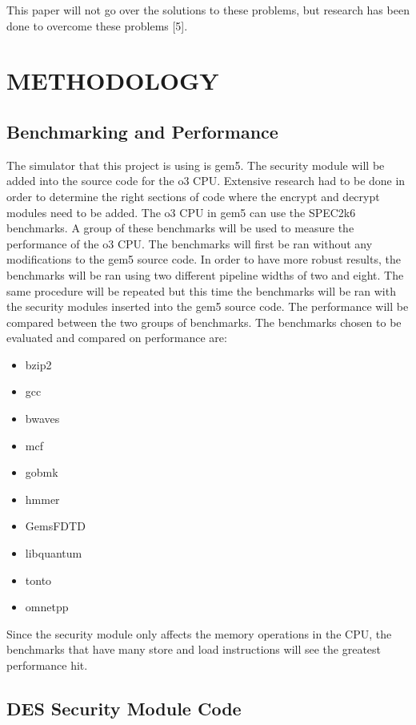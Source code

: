 \documentclass[letterpaper, 10 pt, conference]{ieeeconf}  %
\begin{document}
This paper will not go over the solutions to these problems, but research has been done to overcome these problems [5].  

\section{METHODOLOGY}

\subsection{Benchmarking and Performance}

The simulator that this project is using is gem5. The security module will be added into the source code for the o3 CPU. Extensive research had to be done in order to determine the right sections of code where the encrypt and decrypt modules need to be added.  The o3 CPU in gem5 can use the SPEC2k6 benchmarks.  A group of these benchmarks will be used to measure the performance of the o3 CPU.  The benchmarks will first be ran without any modifications to the gem5 source code.  In order to have more robust results, the benchmarks will be ran using two different pipeline widths of two and eight.  The same procedure will be repeated but this time the benchmarks will be ran with the security modules inserted into the gem5 source code. The performance will be compared between the two groups of benchmarks.  The benchmarks chosen to be evaluated and compared on performance are:

\begin{multicols}{2}
\begin{itemize}
\item bzip2
\item gcc
\item bwaves
\item mcf
\item gobmk
\item hmmer
\item GemsFDTD
\item libquantum
\item tonto
\item omnetpp
\end{itemize}
\end{multicols}

Since the security module only affects the memory operations in the CPU, the benchmarks that have many store and load instructions will see the greatest performance hit.

\subsection{DES Security Module Code}
\end{document}
